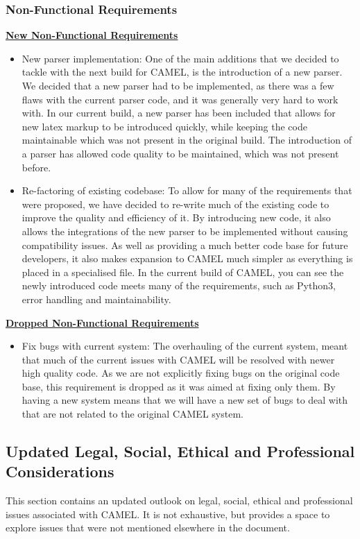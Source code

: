 \subsubsection*{Non-Functional Requirements}
	\underline{\textbf{New Non-Functional Requirements}}
	\begin{itemize}
		
		\item New parser implementation: One of the main additions that we decided to tackle with the next build for CAMEL, is the introduction of a new parser. We decided that a new parser had to be implemented, as there was a few flaws with the current parser code, and it was generally very hard to work with. In our current build, a new parser has been included that allows for new latex markup to be introduced quickly, while keeping the code maintainable which was not present in the original build. The introduction of a parser has allowed code quality to be maintained, which was not present before.   
		
		\item Re-factoring of existing codebase: To allow for many of the requirements that were proposed, we have decided to re-write much of the existing code to improve the quality and efficiency of it. By introducing new code, it also allows the integrations of the new parser to be implemented without causing compatibility issues. As well as providing a much better code base for future developers, it also makes expansion to CAMEL much simpler as everything is placed in a specialised file. In the current build of CAMEL, you can see the newly introduced code meets many of the requirements, such as Python3, error handling and maintainability. 
	\end{itemize}
	
	\underline{\textbf{Dropped Non-Functional Requirements}}
	\begin{itemize}
		\item Fix bugs with current system: The overhauling of the current system, meant that much of the current issues with CAMEL will be resolved with newer high quality code. As we are not explicitly fixing bugs on the original code base, this requirement is dropped as it was aimed at fixing only them. By having a new system means that we will have a new set of bugs to deal with that are not related to the original CAMEL system.
	\end{itemize}

	\subsection*{Updated Legal, Social, Ethical and Professional Considerations}
	This section contains an updated outlook on legal, social, ethical and professional issues associated with CAMEL. It is not exhaustive, but provides a space to explore issues that were not mentioned elsewhere in the document.

